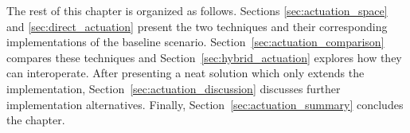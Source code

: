 \bigskip

The rest of this chapter is organized as follows.
Sections \ref{sec:actuation_space} and \ref{sec:direct_actuation} present the two techniques and their corresponding implementations of the baseline scenario. %
Section~\ref{sec:actuation_comparison} compares these techniques and Section~\ref{sec:hybrid_actuation} explores how they can interoperate. %
After presenting a neat solution which only extends the \Space{} implementation, Section~\ref{sec:actuation_discussion} discusses further implementation alternatives.
Finally, Section~\ref{sec:actuation_summary} concludes the chapter.








